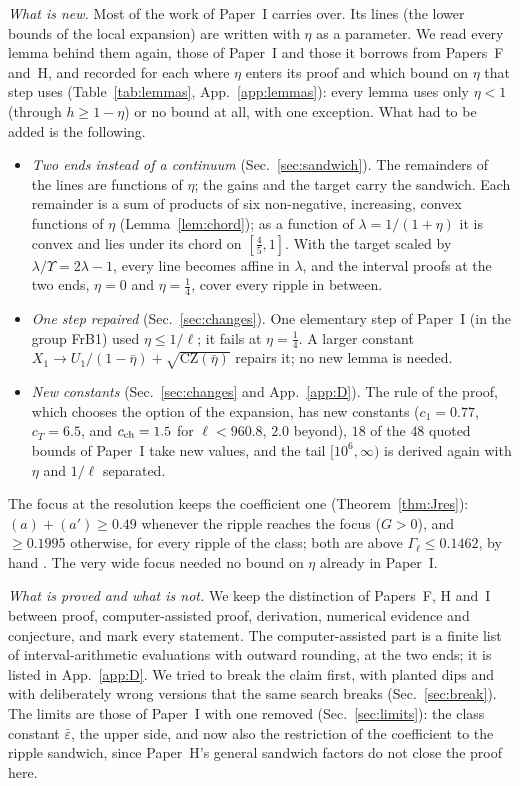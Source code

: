 \emph{What is new.}
Most of the work of Paper~I carries over.
Its lines (the lower bounds of the local expansion) are written with $\eta$ as a parameter.
We read every lemma behind them again, those of Paper~I and those it borrows from Papers~F and~H, and recorded for each where $\eta$ enters its proof and which bound on $\eta$ that step uses (Table~\ref{tab:lemmas}, App.~\ref{app:lemmas}): every lemma uses only $\eta<1$ (through $h\ge1-\eta$) or no bound at all, with one exception.
What had to be added is the following.
\begin{itemize}
\item \emph{Two ends instead of a continuum} (Sec.~\ref{sec:sandwich}).
  The remainders of the lines are functions of $\eta$; the gains and the target carry the sandwich.
  Each remainder is a sum of products of six non-negative, increasing, convex functions of $\eta$ (Lemma~\ref{lem:chord}); as a function of $\lambda=1/(1+\eta)$ it is convex and lies under its chord on $[\tfrac45,1]$.
  With the target scaled by $\lambda/\Upsilon=2\lambda-1$, every line becomes affine in $\lambda$, and the interval proofs at the two ends, $\eta=0$ and $\eta=\tfrac14$, cover every ripple in between.
\item \emph{One step repaired} (Sec.~\ref{sec:changes}).
  One elementary step of Paper~I (in the group FrB1) used $\eta\le1/\ell$; it fails at $\eta=\tfrac14$.
  A larger constant $X_1\to U_1/(1-\bar\eta)+\sqrt{\mathrm{CZ}(\bar\eta)}$ repairs it; no new lemma is needed.
\item \emph{New constants} (Sec.~\ref{sec:changes} and App.~\ref{app:D}).
  The rule of the proof, which chooses the option of the expansion, has new constants ($c_1=0.77$, $c_T=6.5$, and $c_{\rm ch}=1.5$ for $\ell<960.8$, $2.0$ beyond), $18$ of the $48$ quoted bounds of Paper~I take new values, and the tail $[10^6,\infty)$ is derived again with $\eta$ and $1/\ell$ separated.
\end{itemize}
The focus at the resolution keeps the coefficient one (Theorem~\ref{thm:Jres}): $(a)+(a')\ge0.49$ whenever the ripple reaches the focus ($G>0$), and $\ge0.1995$ otherwise, for every ripple of the class; both are above $\Gamma_\ell\le0.1462$, by hand \proofst.
The very wide focus needed no bound on $\eta$ already in Paper~I.

\emph{What is proved and what is not.}
We keep the distinction of Papers~F, H and~I between proof, computer-assisted proof, derivation, numerical evidence and conjecture, and mark every statement.
The computer-assisted part is a finite list of interval-arithmetic evaluations with outward rounding, at the two ends; it is listed in App.~\ref{app:D}.
We tried to break the claim first, with planted dips and with deliberately wrong versions that the same search breaks (Sec.~\ref{sec:break}).
The limits are those of Paper~I with one removed (Sec.~\ref{sec:limits}): the class constant $\bar\varepsilon$, the upper side, and now also the restriction of the coefficient to the ripple sandwich, since Paper~H's general sandwich factors do not close the proof here.

